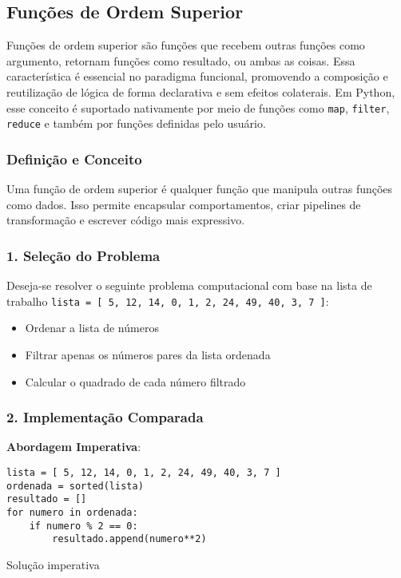 
\subsection{Funções de Ordem Superior}
Funções de ordem superior são funções que recebem outras funções como argumento, retornam funções como resultado, ou ambas as coisas. Essa característica é essencial no paradigma funcional, promovendo a composição e reutilização de lógica de forma declarativa e sem efeitos colaterais. Em Python, esse conceito é suportado nativamente por meio de funções como \texttt{map}, \texttt{filter}, \texttt{reduce} e também por funções definidas pelo usuário.

\subsubsection{Definição e Conceito}
Uma função de ordem superior é qualquer função que manipula outras funções como dados. Isso permite encapsular comportamentos, criar pipelines de transformação e escrever código mais expressivo.

\subsubsection*{1. Seleção do Problema}

Deseja-se resolver o seguinte problema computacional com base na lista de trabalho \texttt{lista = [ 5, 12, 14, 0, 1, 2, 24, 49, 40, 3, 7 ]}:
\begin{itemize}
    \item Ordenar a lista de números
    \item Filtrar apenas os números pares da lista ordenada
    \item Calcular o quadrado de cada número filtrado
\end{itemize}

\subsubsection*{2. Implementação Comparada}

\textbf{Abordagem Imperativa}:

\begin{listing}[!ht]
\begin{verbatim}
lista = [ 5, 12, 14, 0, 1, 2, 24, 49, 40, 3, 7 ]
ordenada = sorted(lista)
resultado = []
for numero in ordenada:
    if numero % 2 == 0:
        resultado.append(numero**2)
\end{verbatim}
\caption{Solução imperativa}
\label{listing:hof_imperativa}
\end{listing}

